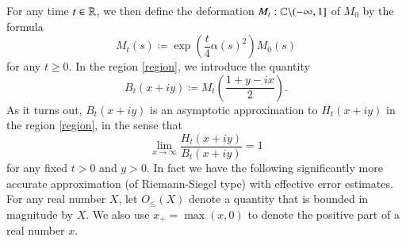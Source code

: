 For any time $t \in \mathbb{R}$, we then define the deformation $M_t: \mathbb{C} \backslash (-\infty,1]$ of $M_0$ by the formula
\begin{equation}\label{Mt-def}
M_t(s) \coloneqq \exp\left( \frac{t}{4} \alpha(s)^2 \right) M_0(s)
\end{equation}
for any $t \geq 0$.
In the region \eqref{region}, we introduce the quantity
\begin{equation}\label{bo-def} 
B_t(x+iy) \coloneqq M_t\left(\frac{1+y-ix}{2}\right).
\end{equation} 
As it turns out, $B_t(x+iy)$ is an asymptotic approximation to $H_t(x+iy)$ in the region \eqref{region}, in the sense that
\begin{equation}\label{limx}
 \lim_{x \to \infty} \frac{H_t(x+iy)}{B_t(x+iy)} = 1
\end{equation}
for any fixed $t>0$ and $y>0$.  In fact we have the following significantly more accurate approximation (of Riemann-Siegel type) with effective error estimates.
For any real number $X$, let $O_{\leq}(X)$ denote a quantity that is bounded in magnitude by $X$. We also use $x_+ = \max(x,0)$ to denote the positive part of a real number $x$.

